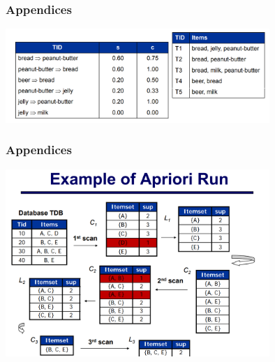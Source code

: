 \documentclass{beamer}
\begin{document}
\begin{frame}
\frametitle{Appendices}
	\includegraphics[width=100mm]{as.png}
\end{frame}
\begin{frame}
\frametitle{Appendices}

\includegraphics[width=100mm]{api.png}
\end{frame}
\end{document}

